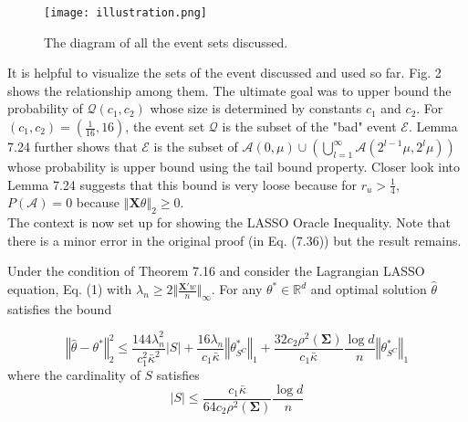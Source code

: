 \documentclass[a4paper, 11pt]{article}
\begin{document}
\begin{figure}
  \centering
  \texttt{[image: illustration.png]}
  \caption{The diagram of all the event sets discussed. }
  \label{fig:event}
\end{figure}


It is helpful to visualize the sets of the event discussed and used so far. Fig. 2 shows the relationship among them. The ultimate goal was to upper bound the probability of $\mathcal{Q}(c_1, c_2)$ whose size is determined by constants $c_1$ and $c_2$. For $(c_1, c_2) = \left( \frac{1}{16}, 16\right)$, the event set $\mathcal{Q}$ is the subset of the "bad" event $\mathcal{E}$. Lemma 7.24 further shows that $\mathcal{E}$ is the subset of $\mathcal{A}(0, \mu) \cup \left(\bigcup_{l=1}^\infty \mathcal{A}(2^{l-1}\mu, 2^l\mu) \right)$ whose probability is upper bound using the tail bound property. Closer look into Lemma 7.24 suggests that this bound is very loose because for $r_u > \frac{1}{4}$, $P(\mathcal{A}) = 0$ because $\left\Vert\mathbf{X}\theta \right\Vert_2 \geq 0$. \\

The context is now set up for showing the LASSO Oracle Inequality. Note that there is a minor error in the original proof (in Eq. (7.36)) but the result remains.

\begin{customthm}{7.19}
Under the condition of Theorem 7.16 and consider the Lagrangian LASSO equation, Eq. (1) with $\lambda_n \geq 2 \Vert\frac{\mathbf{X}'w}{n} \Vert_\infty$. For any $\theta^*\in\mathbb{R}^d$ and optimal solution $\hat{\theta}$ satisfies the bound

\begin{equation}
\left\Vert\hat{\theta}-\theta^*\right\Vert_2^2 \leq \frac{144\lambda_n^2}{c_1^2\bar{\kappa}^2}|S| + \frac{16\lambda_n}{c_1\bar{\kappa}}\left\Vert\theta^*_{S^C} \right\Vert_1 + \frac{32c_2\rho^2(\mathbf{\Sigma})}{c_1\bar{\kappa}}\frac{\log d}{n}\left\Vert\theta^*_{S^C} \right\Vert_1
\end{equation}
where the cardinality of $S$ satisfies
\begin{equation}
|S| \leq \frac{c_1\bar{\kappa}}{64c_2\rho^2(\mathbf{\Sigma})}\frac{\log d}{n}
\end{equation}
\end{customthm}
\end{document}
